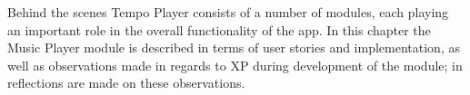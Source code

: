 Behind the scenes Tempo Player consists of a number of modules, each playing an important role in the overall functionality of the app. In this chapter the Music Player module is described in terms of user stories and implementation, as well as observations made in regards to XP during development of the module; in  reflections are made on these observations.